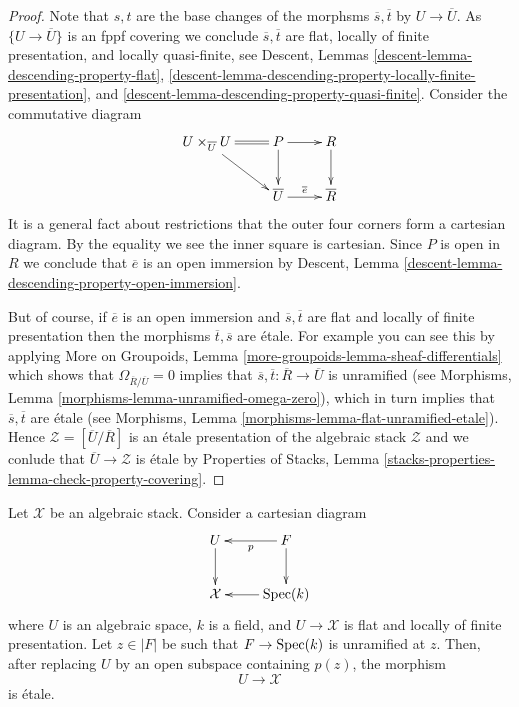\begin{proof}
\medskip\noindent
Note that $s, t$ are the base changes of the morphsms
$\overline{s}, \overline{t}$ by $U \to \overline{U}$.
As $\{U \to \overline{U}\}$ is an fppf covering we conclude
$\overline{s}, \overline{t}$ are flat, locally of finite presentation, and
locally quasi-finite, see
Descent, Lemmas \ref{descent-lemma-descending-property-flat},
\ref{descent-lemma-descending-property-locally-finite-presentation}, and
\ref{descent-lemma-descending-property-quasi-finite}.
Consider the commutative diagram
$$
\xymatrix{
U \times_{\overline{U}} U \ar@{=}[r] \ar[rd] & P \ar[r] \ar[d] & R \ar[d] \\
& \overline{U} \ar[r]^{\overline{e}} & \overline{R}
}
$$
It is a general fact about restrictions that the outer four corners
form a cartesian diagram. By the equality we see the inner square is
cartesian. Since $P$ is open in $R$ we conclude that $\overline{e}$
is an open immersion by
Descent, Lemma \ref{descent-lemma-descending-property-open-immersion}.

\medskip\noindent
But of course, if $\overline{e}$ is an open immersion and
$\overline{s}, \overline{t}$ are flat and locally of finite presentation
then the morphisms $\overline{t}, \overline{s}$ are \'etale.
For example you can see this by applying
More on Groupoids, Lemma \ref{more-groupoids-lemma-sheaf-differentials}
which shows that $\Omega_{\overline{R}/\overline{U}} = 0$
implies that $\overline{s}, \overline{t} : \overline{R} \to \overline{U}$
is unramified (see
Morphisms, Lemma \ref{morphisms-lemma-unramified-omega-zero}),
which in turn implies that $\overline{s}, \overline{t}$ are \'etale
(see
Morphisms, Lemma \ref{morphisms-lemma-flat-unramified-etale}).
Hence $\mathcal{Z} = [\overline{U}/\overline{R}]$ is an \'etale
presentation of the algebraic stack $\mathcal{Z}$ and we conlude that
$\overline{U} \to \mathcal{Z}$ is \'etale by
Properties of Stacks, Lemma
\ref{stacks-properties-lemma-check-property-covering}.
\end{proof}

\begin{lemma}
\label{lemma-etale-at-point}
Let $\mathcal{X}$ be an algebraic stack. Consider a cartesian diagram
$$
\xymatrix{
U \ar[d] & F \ar[l]^p \ar[d] \\
\mathcal{X} & \Spec(k) \ar[l]
}
$$
where $U$ is an algebraic space, $k$ is a field, and $U \to \mathcal{X}$
is flat and locally of finite presentation. Let $z \in |F|$ be such that
$F \to \mathop{\rm Spec}(k)$ is unramified at $z$. Then, after replacing $U$ by
an open subspace containing $p(z)$, the morphism
$$
U \longrightarrow \mathcal{X}
$$
is \'etale.
\end{lemma}

